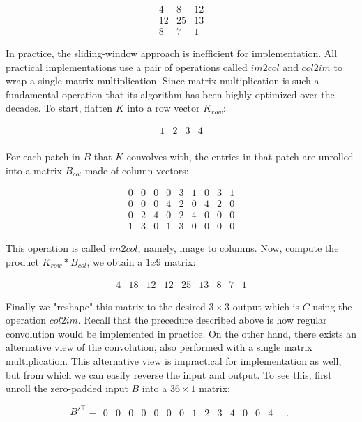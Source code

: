 $$
\begin{matrix}
  4 & 8 & 12 \\
  12 & 25 & 13 \\
  8 & 7 & 1
\end{matrix}
$$

In practice, the sliding-window approach is inefficient for implementation. All practical implementations
use a pair of operations called $im2col$ and $col2im$ to wrap a single matrix multiplication. Since
matrix multiplication is such a fundamental operation that its algorithm has been highly optimized over the
decades. To start, flatten $K$ into a row vector $K_{row}$:

$$
\begin{matrix}
  1 & 2 & 3 & 4 \\
\end{matrix}
$$

For each patch in $B$ that $K$ convolves with, the entries in that patch are unrolled into a matrix $B_{col}$
made of column vectors:

$$
\begin{matrix}
  0 & 0 & 0 & 0 & 3 & 1 & 0 & 3 & 1 \\
  0 & 0 & 0 & 4 & 2 & 0 & 4 & 2 & 0 \\
  0 & 2 & 4 & 0 & 2 & 4 & 0 & 0 & 0 \\
  1 & 3 & 0 & 1 & 3 & 0 & 0 & 0 & 0
\end{matrix}
$$

This operation is called $im2col$, namely, image to columns. Now, compute the product $K_{row} * B_{col}$, we
obtain a $1x9$ matrix:

$$
\begin{matrix}
  4 & 18 & 12 & 12 & 25 & 13 & 8 & 7 & 1
\end{matrix}
$$

Finally we "reshape" this matrix to the desired $3 \times 3$ output which is $C$ using the operation $col2im$.
Recall that the precedure described above is how regular convolution would be implemented in practice.
On the other hand, there exists an alternative view of the convolution, also performed with a single
matrix multiplication. This alternative view is impractical for implementation as well, but from which
we can easily reverse the input and output. To see this, first unroll the zero-padded input $B$ into
a $36 \times 1$ matrix:

\setcounter{MaxMatrixCols}{20}

$$
B'^\intercal =
\begin{matrix}
  0 & 0 & 0 & 0 & 0 & 0 & 0 & 1 & 2 & 3 & 4 & 0 & 0 & 4 & \dots
\end{matrix}
$$

